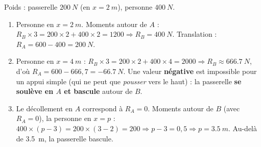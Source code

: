 \documentclass[11pt,a4paper]{article}
\begin{document}
\begin{corrige}
Poids : passerelle $\qty{200}{N}$ (en $x=\qty{2}{m}$), personne $\qty{400}{N}$.
\begin{enumerate}[label=\alph*)]
  \item Personne en $x=\qty{2}{m}$. Moments autour de $A$ :
        $R_B\times 3 = 200\times 2 + 400\times 2 = 1200 \Rightarrow R_B = \qty{400}{N}$.
        Translation : $R_A = 600 - 400 = \qty{200}{N}$.
  \item Personne en $x=\qty{4}{m}$ : $R_B\times 3 = 200\times 2 + 400\times 4 = 2000 \Rightarrow
        R_B \approx \qty{666.7}{N}$, d'où $R_A = 600 - 666{,}7 = \qty{-66.7}{N}$. Une valeur
        \textbf{négative} est impossible pour un appui simple (qui ne peut que \emph{pousser} vers le
        haut) : la passerelle \textbf{se soulève en $A$ et bascule} autour de $B$.
  \item Le décollement en $A$ correspond à $R_A = 0$. Moments autour de $B$ (avec $R_A=0$), la personne
        en $x=p$ : $400\times(p-3) = 200\times(3-2) = 200 \Rightarrow p-3 = 0{,}5 \Rightarrow
        p = \qty{3.5}{m}$. Au-delà de \qty{3.5}{m}, la passerelle bascule.
\end{enumerate}
\end{corrige}
\end{document}
